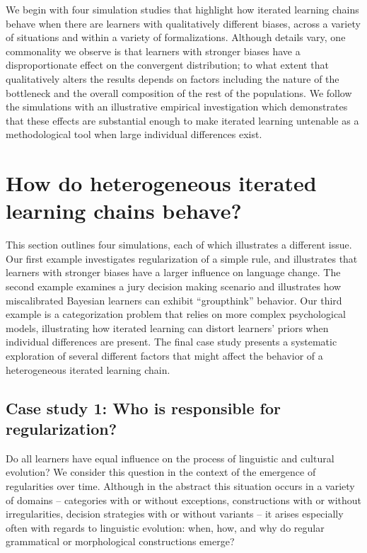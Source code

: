 \documentclass[doc]{apa6}
\begin{document}
We begin with four simulation studies that highlight how iterated learning chains behave when there are learners with qualitatively different biases, across a variety of situations and within a variety of formalizations. Although details vary, one commonality we observe is that learners with stronger biases have a disproportionate effect on the convergent distribution; to what extent that qualitatively alters the results depends on factors including the nature of the bottleneck and the overall composition of the rest of the populations. We follow the simulations with an illustrative empirical investigation which demonstrates that these effects are substantial enough to make iterated learning untenable as a methodological tool when large individual differences exist.


\section{How do heterogeneous iterated learning chains behave?}

This section outlines four simulations, each of which illustrates a different issue. Our first example investigates regularization of a simple rule, and  illustrates that learners with stronger biases have a larger influence on language change. The second example examines a jury decision making scenario and illustrates how miscalibrated Bayesian learners can exhibit ``groupthink'' behavior. Our third example is a categorization problem that relies on more complex psychological models, illustrating how iterated learning can distort learners' priors when individual differences are present. The final case study presents a systematic exploration of several different factors that might affect the behavior of a heterogeneous iterated learning chain.

\subsection{Case study 1: Who is responsible for regularization?}

Do all learners have equal influence on the process of linguistic and cultural evolution? We consider this question in the context of the emergence of regularities over time. Although in the abstract this situation occurs in a variety of domains -- categories with or without exceptions, constructions with or without irregularities, decision strategies with or without variants -- it arises especially often with regards to linguistic evolution: when, how, and why do regular grammatical or morphological constructions emerge? 
\end{document}
